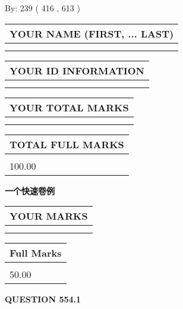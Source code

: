 \documentclass{ctexart}
\begin{document}
   
\hspace{1.0in} By: 
 239 ( 416 ,  613 )
   
   
   
   
\newpage 
\setcounter{page}{ 
   554001 } 
   
   
   
   
\noindent\begin{tabular}{|l|}
\hline
YOUR NAME (FIRST, ... LAST)  \\
\hline
 \\ 
 \\ 
\hline
\end{tabular}
\hspace{0.05in} \begin{tabular}{|l|}
\hline
 YOUR   ID   INFORMATION  \\
\hline
 \\ 
 \\ 
\hline
\end{tabular}
   
   
\vspace{0.2in}\noindent\begin{tabular}{|l|}
\hline
YOUR TOTAL MARKS  \\
\hline
 \\ 
 \\ 
\hline
\end{tabular}
\hspace{0.05in} \begin{tabular}{|l|}
\hline
TOTAL FULL MARKS  \\
\hline
 \\ 
100.00 \\
\hline
\end{tabular}
   
   
 \vspace{0.2in}
{\LARGE {\textbf{ 一个快速卷例}}}
   
   
  
\vspace{0.2in}
  
\noindent\begin{tabular}{|l|}
\hline
 YOUR MARKS  \\
\hline
 \\ 
 \\ 
\hline
\end{tabular}
\hspace{0.05in} \begin{tabular}{|l|}
\hline
 Full Marks  \\
\hline
 \\ 
50.00 \\
\hline
\end{tabular}
{\textbf{\Large{QUESTION
554.1 
}}}
  
\end{document}

